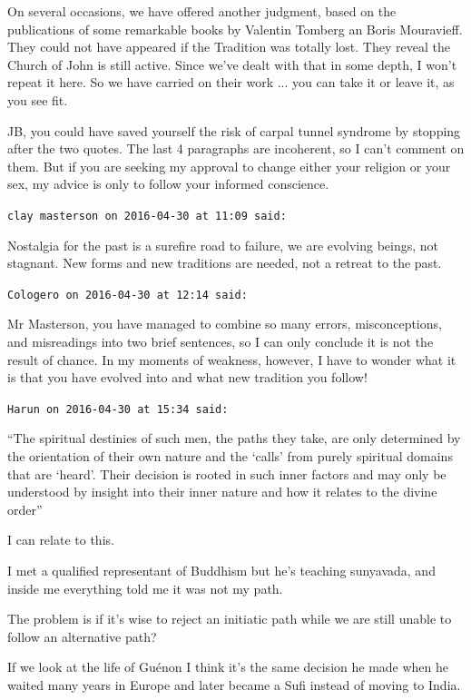 \begin{footnotesize}
\begin{sffamily}
On several occasions, we have offered another judgment, based on the publications of some remarkable books by Valentin Tomberg an Boris Mouravieff. They could not have appeared if the Tradition was totally lost. They reveal the Church of John is still active. Since we've dealt with that in some depth, I won't repeat it here. So we have carried on their work ... you can take it or leave it, as you see fit.

JB, you could have saved yourself the risk of carpal tunnel syndrome by stopping after the two quotes. The last 4 paragraphs are incoherent, so I can't comment on them. But if you are seeking my approval to change either your religion or your sex, my advice is only to follow your informed conscience.

\hfill

\texttt{clay masterson on 2016-04-30 at 11:09 said:}

Nostalgia for the past is a surefire road to failure, we are evolving beings, not stagnant. New forms and new traditions are needed, not a retreat to the past.

\hfill

\texttt{Cologero on 2016-04-30 at 12:14 said:}

Mr Masterson, you have managed to combine so many errors, misconceptions, and misreadings into two brief sentences, so I can only conclude it is not the result of chance. In my moments of weakness, however, I have to wonder what it is that you have evolved into and what new tradition you follow!

\hfill

\texttt{Harun on 2016-04-30 at 15:34 said:}

``The spiritual destinies of such men, the paths they take, are only determined by the orientation of their own nature and the `calls' from purely spiritual domains that are `heard'. Their decision is rooted in such inner factors and may only be understood by insight into their inner nature and how it relates to the divine order''

I can relate to this.

I met a qualified representant of Buddhism but he's teaching sunyavada, and inside me everything told me it was not my path.

The problem is if it's wise to reject an initiatic path while we are still unable to follow an alternative path?

If we look at the life of Guénon I think it's the same decision he made when he waited many years in Europe and later became a Sufi instead of moving to India.


\end{sffamily}
\end{footnotesize}
